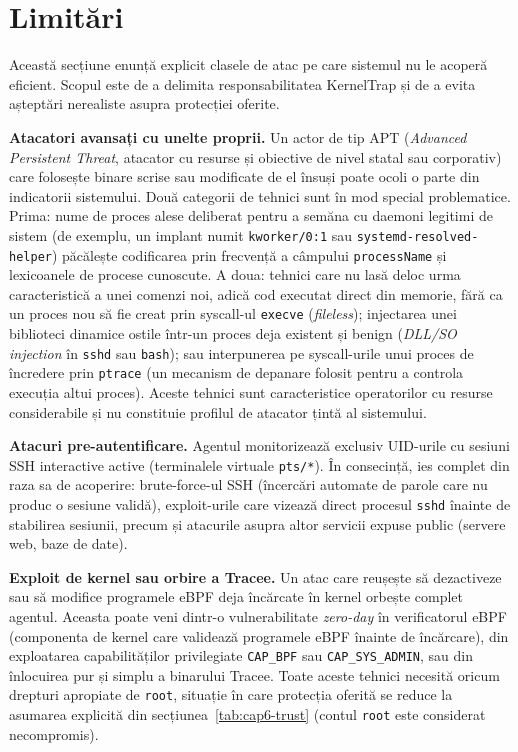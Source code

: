 \section{Limitări}

Această secțiune enunță explicit clasele de atac pe care sistemul nu le
acoperă eficient. Scopul este de a delimita responsabilitatea KernelTrap și
de a evita așteptări nerealiste asupra protecției oferite.

\textbf{Atacatori avansați cu unelte proprii.} Un actor de tip APT
(\textit{Advanced Persistent Threat}, atacator cu resurse și obiective de
nivel statal sau corporativ) care folosește binare scrise sau modificate
de el însuși poate ocoli o parte din indicatorii sistemului. Două categorii
de tehnici sunt în mod special problematice. Prima: nume de proces alese
deliberat pentru a semăna cu daemoni legitimi de sistem (de exemplu, un
implant numit \texttt{kworker/0:1} sau \texttt{systemd-resolved-helper})
păcălește codificarea prin frecvență a câmpului \texttt{processName} și
lexicoanele de procese cunoscute. A doua: tehnici care nu lasă deloc urma
caracteristică a unei comenzi noi, adică cod executat direct din memorie, fără
ca un proces nou să fie creat prin syscall-ul \texttt{execve} (\textit{fileless});
injectarea unei biblioteci dinamice ostile într-un proces deja existent și
benign (\textit{DLL/SO injection} în \texttt{sshd} sau \texttt{bash});
sau interpunerea pe syscall-urile unui proces de încredere prin
\texttt{ptrace} (un mecanism de depanare folosit pentru a controla execuția
altui proces). Aceste tehnici sunt caracteristice operatorilor cu resurse
considerabile și nu constituie profilul de atacator țintă al sistemului.

\textbf{Atacuri pre-autentificare.} Agentul monitorizează exclusiv UID-urile
cu sesiuni SSH interactive active (terminalele virtuale \texttt{pts/*}).
În consecință, ies complet din raza sa de acoperire: brute-force-ul SSH
(încercări automate de parole care nu produc o sesiune validă), exploit-urile
care vizează direct procesul \texttt{sshd} înainte de stabilirea sesiunii,
precum și atacurile asupra altor servicii expuse public (servere web,
baze de date).

\textbf{Exploit de kernel sau orbire a Tracee.} Un atac care reușește să
dezactiveze sau să modifice programele eBPF deja încărcate în kernel orbește
complet agentul. Aceasta poate veni dintr-o vulnerabilitate
\textit{zero-day} în verificatorul eBPF (componenta de kernel care validează
programele eBPF înainte de încărcare), din exploatarea capabilităților
privilegiate \texttt{CAP\_BPF} sau \texttt{CAP\_SYS\_ADMIN}, sau din
înlocuirea pur și simplu a binarului Tracee. Toate aceste tehnici necesită
oricum drepturi apropiate de \texttt{root}, situație în care protecția
oferită se reduce la asumarea explicită din secțiunea~\ref{tab:cap6-trust}
(contul \texttt{root} este considerat necompromis).

